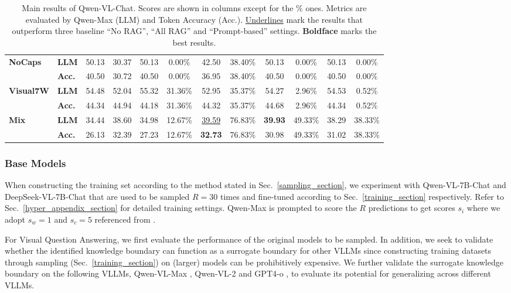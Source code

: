 \begin{table*}
{\begin{tabular}{llcccccccc|cc}
\midrule
\multirow{2}{*}{\textbf{NoCaps}} & \textbf{LLM} & 50.13 & 30.37 & 50.13 & 0.00\% & 42.50 & 38.40\% & 50.13 & 0.00\% & 50.13 & 0.00\% \\
  & \textbf{Acc.} & 40.50 & 30.72 & 40.50 & 0.00\% & 36.95 & 38.40\% & 40.50 & 0.00\% & 40.50 & 0.00\% \\
\midrule
\multirow{2}{*}{\textbf{Visual7W}} & \textbf{LLM} & 54.48 & 52.04 & 55.32 & 31.36\% & 52.95 & 35.37\% & 54.27 & 2.96\% & 54.53 & 0.52\% \\
  & \textbf{Acc.} & 44.34 & 44.94 & 44.18 & 31.36\% & 44.32 & 35.37\% & 44.68 & 2.96\% & 44.34 & 0.52\% \\
\midrule
\midrule
\multirow{2}{*}{\textbf{Mix}} & \textbf{LLM} & 34.44 & 38.60 & 34.98 & 12.67\% & \uline{39.59} & 76.83\% & \textbf{39.93} & 49.33\% & 38.29 & 38.33\% \\
  & \textbf{Acc.} & 26.13 & 32.39 & 27.23 & 12.67\% & \textbf{32.73} & 76.83\% & 30.98 & 49.33\% & 31.02 & 38.33\% \\
\bottomrule
\end{tabular}
}
\caption{Main results of Qwen-VL-Chat. Scores are shown in columns except for the \% ones. Metrics are evaluated by Qwen-Max (LLM) and Token Accuracy (Acc.). \underline{Underlines} mark the results that outperform three baseline ``No RAG'', ``All RAG'' and ``Prompt-based'' settings. \textbf{Boldface} marks the best results.}
\label{main_results_7b_table}
\end{table*}

\subsubsection{Base Models}
When constructing the training set according to the method stated in Sec.~\ref{sampling_section}, we experiment with Qwen-VL-7B-Chat and DeepSeek-VL-7B-Chat that are used to be sampled $R=30$ times and fine-tuned according to Sec.~\ref{training_section} respectively. Refer to Sec.~\ref{hyper_appendix_section} for detailed training settings. Qwen-Max is prompted to score the $R$ predictions to get scores $s_i$ where we adopt $s_w=1$ and $s_c = 5$ referenced from \citet{Liu_LlamaIndex_2022}. 


For Visual Question Answering, we first evaluate the performance of the original models to be sampled. In addition, we seek to validate whether the identified knowledge boundary can function as a surrogate boundary for other VLLMs since constructing training datasets through sampling (Sec.~\ref{training_section}) on (larger) models can be prohibitively expensive. We further validate the surrogate knowledge boundary on the following VLLMs, Qwen-VL-Max \cite{Qwen-VL}, Qwen-VL-2 \cite{Qwen2-VL} and GPT4-o \cite{hurst2024gpt}, to evaluate its potential for generalizing across different VLLMs.


